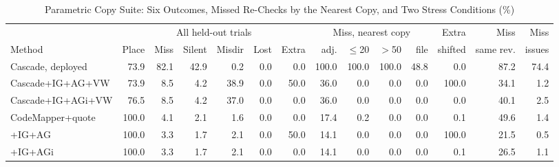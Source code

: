 \begin{table}[t]
\caption{Parametric Copy Suite: Six Outcomes, Missed Re-Checks by the Nearest Copy, and Two Stress Conditions (\%)}\label{tab:copysuite}
\centering\footnotesize
\setlength{\tabcolsep}{3pt}
\begin{tabular}{@{}lrrrrrrrrrrrrr@{}}\toprule
 & \multicolumn{6}{c}{All held-out trials} & \multicolumn{4}{c}{Miss, nearest copy} & Extra & Miss & Miss \\ \cmidrule(lr){2-7}\cmidrule(lr){8-11}
Method & Place & Miss & Silent & Misdir & Lost & Extra & adj. & $\le$20 & $>$50 & file & shifted & same rev. & issues \\ \midrule
Cascade, deployed & 73.9 & 82.1 & 42.9 & 0.2 & 0.0 & 0.0 & 100.0 & 100.0 & 100.0 & 48.8 & 0.0 & 87.2 & 74.4 \\
Cascade+IG+AG+VW & 73.9 & 8.5 & 4.2 & 38.9 & 0.0 & 50.0 & 36.0 & 0.0 & 0.0 & 0.0 & 100.0 & 34.1 & 1.2 \\
Cascade+IG+AGi+VW & 76.5 & 8.5 & 4.2 & 37.0 & 0.0 & 0.0 & 36.0 & 0.0 & 0.0 & 0.0 & 0.0 & 40.1 & 2.5 \\
CodeMapper+quote & 100.0 & 4.1 & 2.1 & 1.6 & 0.0 & 0.0 & 17.4 & 0.2 & 0.0 & 0.0 & 0.1 & 49.6 & 1.4 \\
\quad +IG+AG & 100.0 & 3.3 & 1.7 & 2.1 & 0.0 & 50.0 & 14.1 & 0.0 & 0.0 & 0.0 & 100.0 & 21.5 & 0.5 \\
\quad +IG+AGi & 100.0 & 3.3 & 1.7 & 2.1 & 0.0 & 0.0 & 14.1 & 0.0 & 0.0 & 0.0 & 0.1 & 26.5 & 1.1 \\
\bottomrule
\end{tabular}
\end{table}
